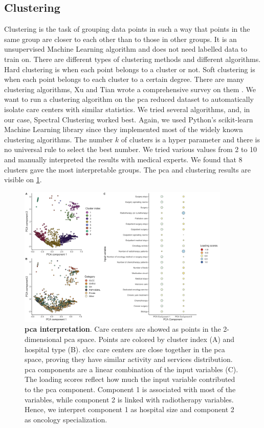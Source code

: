 \subsection{Clustering}

Clustering is the task of grouping data points in such a way that points in the same group are closer to each other than to those in other groups. It is an unsupervised Machine Learning algorithm and does not need labelled data to train on. There are different types of clustering methods and different algorithms. Hard clustering is when each point belongs to a cluster or not. Soft clustering is when each point belongs to each cluster to a certain degree. There are many clustering algorithms, Xu and Tian wrote a comprehensive survey on them \cite{xu_comprehensive_2015}. We want to run a clustering algorithm on the \ac{pca} reduced dataset to automatically isolate care centers with similar statistics. We tried several algorithms, and, in our case, Spectral Clustering \cite{luxburg_tutorial_2007} worked best. Again, we used Python's scikit-learn Machine Learning library \cite{pedregosa_scikit-learn_2011} since they implemented most of the widely known clustering algorithms. The number $k$ of clusters is a hyper parameter and there is no universal rule to select the best number. We tried various values from 2 to 10 and manually interpreted the results with medical experts. We found that 8 clusters gave the most interpretable groups. The \ac{pca} and clustering results are visible on \cref{fig:clustering-pca}.

\begin{figure}[H]
    \includegraphics[width=0.9\textwidth]{images/camion/supplemental/sup_fig1_pca_and_clustering.png}
    \centering
    \caption{
        \textbf{\ac{pca} interpretation}. Care centers are showed as points in the 2-dimensional \ac{pca} space. Points are colored by cluster index (A) and hospital type (B). \ac{clcc} care centers are close together in the \ac{pca} space, proving they have similar activity and services distribution. \ac{pca} components are a linear combination of the input variables (C). The loading scores reflect how much the input variable contributed to the \ac{pca} component. Component 1 is associated with most of the variables, while component 2 is linked with radiotherapy variables. Hence, we interpret component 1 as hospital size and component 2 as oncology specialization.
    }
    \label{fig:clustering-pca}
\end{figure}


